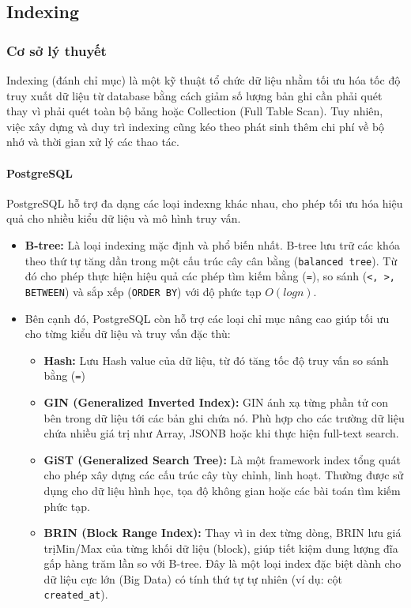 \subsection{Indexing}
\subsubsection{Cơ sở lý thuyết}
Indexing (đánh chỉ mục) là một kỹ thuật tổ chức dữ liệu nhằm tối ưu hóa tốc độ truy xuất dữ liệu từ database bằng cách giảm số lượng bản ghi cần phải quét thay vì phải quét toàn bộ bảng hoặc Collection (Full Table Scan). Tuy nhiên, việc xây dựng và duy trì indexing cũng kéo theo phát sinh thêm chi phí về bộ nhớ và thời gian xử lý các thao tác.
\paragraph{PostgreSQL}
PostgreSQL hỗ trợ đa dạng các loại indexng khác nhau, cho phép tối ưu hóa hiệu quả cho nhiều kiểu dữ liệu và mô hình truy vấn.
\begin{itemize}[label=$\circ$]
    \item \textbf{B-tree:} Là loại indexing mặc định và phổ biến nhất. B-tree lưu trữ các khóa theo thứ tự tăng dần trong một cấu trúc cây cân bằng (\texttt{balanced tree}). Từ đó cho phép thực hiện hiệu quả các phép tìm kiếm bằng (\texttt{=}), so sánh (\texttt{<, >, BETWEEN}) và sắp xếp (\texttt{ORDER BY}) với độ phức tạp $O(log n)$. 
    \item Bên cạnh đó, PostgreSQL còn hỗ trợ các loại chỉ mục nâng cao giúp tối ưu cho từng kiểu dữ liệu và truy vấn đặc thù:
    \begin{itemize}[label=$\bullet$]
        \item \textbf{Hash:} Lưu Hash value của dữ liệu, từ đó tăng tốc độ truy vấn so sánh bằng (\texttt{=})
        \item \textbf{GIN (Generalized Inverted Index):} GIN ánh xạ từng phần tử con bên trong dữ liệu tới các bản ghi chứa nó. Phù hợp cho các trường dữ liệu chứa nhiều giá trị như Array, JSONB hoặc khi thực hiện full-text search.
        \item \textbf{GiST (Generalized Search Tree):} Là một framework index tổng quát cho phép xây dựng các cấu trúc cây tùy chỉnh, linh hoạt. Thường được sử dụng cho dữ liệu hình học, tọa độ không gian hoặc các bài toán tìm kiếm phức tạp.
        \item \textbf{BRIN (Block Range Index):} Thay vì in dex từng dòng, BRIN lưu giá trịMin/Max của từng khối dữ liệu (block), giúp tiết kiệm dung lượng đĩa gấp hàng trăm lần so với B-tree. Đây là một loại index đặc biệt dành cho dữ liệu cực lớn (Big Data) có tính thứ tự tự nhiên (ví dụ: cột \texttt{created\_at}). 
    \end{itemize}
\end{itemize}

